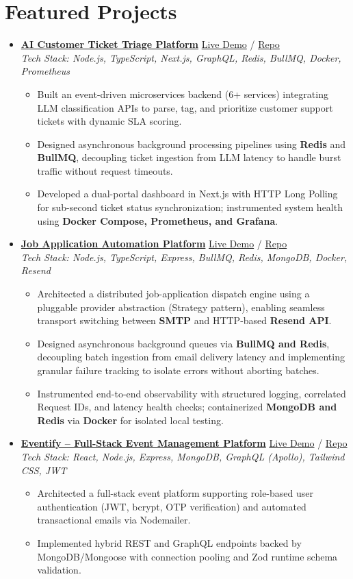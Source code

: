 \documentclass[10pt]{article}
\newcommand{\projectHeader}[4]{
  \item \textbf{\href{#3}{#1}} \hfill \small\href{#4}{Live Demo} / \href{#3}{Repo} \\
  \textit{\small Tech Stack: #2}
}
\newcommand{\subListStart}{\begin{itemize}[leftmargin=0.18in, nosep, topsep=1pt]}
\newcommand{\subListEnd}{\end{itemize}\vspace{2pt}}
\begin{document}
\section{Featured Projects}
\begin{itemize}[label={}, leftmargin=0pt]

  \projectHeader{AI Customer Ticket Triage Platform}{Node.js, TypeScript, Next.js, GraphQL, Redis, BullMQ, Docker, Prometheus}{https://github.com/samirshaikh-dev/ai-ticket-triage-platform}{https://samir-portfolio-dev.vercel.app/projects/ai-customer-ticket-triage}
  \subListStart
    \item Built an event-driven microservices backend (6+ services) integrating LLM classification APIs to parse, tag, and prioritize customer support tickets with dynamic SLA scoring.
    \item Designed asynchronous background processing pipelines using \textbf{Redis} and \textbf{BullMQ}, decoupling ticket ingestion from LLM latency to handle burst traffic without request timeouts.
    \item Developed a dual-portal dashboard in Next.js with HTTP Long Polling for sub-second ticket status synchronization; instrumented system health using \textbf{Docker Compose, Prometheus, and Grafana}.
  \subListEnd

  \projectHeader{Job Application Automation Platform}{Node.js, TypeScript, Express, BullMQ, Redis, MongoDB, Docker, Resend}{https://lnkd.in/d9G8PjzH}{https://lnkd.in/d9G8PjzH}
  \subListStart
    \item Architected a distributed job-application dispatch engine using a pluggable provider abstraction (Strategy pattern), enabling seamless transport switching between \textbf{SMTP} and HTTP-based \textbf{Resend API}.
    \item Designed asynchronous background queues via \textbf{BullMQ and Redis}, decoupling batch ingestion from email delivery latency and implementing granular failure tracking to isolate errors without aborting batches.
    \item Instrumented end-to-end observability with structured logging, correlated Request IDs, and latency health checks; containerized \textbf{MongoDB and Redis} via \textbf{Docker} for isolated local testing.
  \subListEnd

  \projectHeader{Eventify -- Full-Stack Event Management Platform}{React, Node.js, Express, MongoDB, GraphQL (Apollo), Tailwind CSS, JWT}{https://github.com/samirshaikh-dev/eventify}{https://samir-portfolio-dev.vercel.app/projects/eventify}
  \subListStart
    \item Architected a full-stack event platform supporting role-based user authentication (JWT, bcrypt, OTP verification) and automated transactional emails via Nodemailer.
    \item Implemented hybrid REST and GraphQL endpoints backed by MongoDB/Mongoose with connection pooling and Zod runtime schema validation.
  \subListEnd

\end{itemize}
\end{document}
